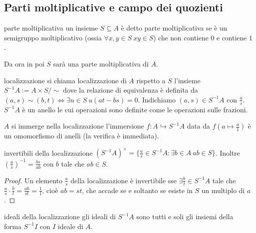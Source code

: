 \subsection{Parti moltiplicative e campo dei quozienti}
\begin{definition}{parte moltiplicativa}
    un insieme $S \subseteq A$ è detto parte moltiplicativa se è un semigruppo moltiplicativo (ossia $\forall x,y\in S \ xy \in S$) che non contiene $0$ e contiene $1$.
    
    Da ora in poi $S$ sarà una parte moltiplicativa di $A$.
\end{definition}
\begin{definition}{localizzazione}
    si chiama localizzazione di $A$ rispetto a $S$ l'insieme $S^{-1}A := A \times S / \sim$ dove la relazione di equivalenza è definita da $(a, s) \sim (b, t) \iff \exists u \in S \ u(at - bs) = 0$. Indichiamo $(a, s) \in S^{-1}A$ con $\frac{a}{s}$. $S^{-1}A$ è un anello le cui operazioni sono definite come le operazioni sulle frazioni.
\end{definition}
\begin{proposition}{$A$ si immerge nella localizzazione}
    l'immersione $f: A \hookrightarrow S^{-1}A$ data da $f(a \mapsto \frac{a}{1})$ è un omomorfismo di anelli (la verifica è immediata).
\end{proposition}
\begin{proposition}{invertibili della localizzazione}
    $(S^{-1}A)^\times = \{ \frac{a}{s} \in S^{-1}A : \exists b \in A \ ab \in S \}$. Inoltre $\left(\frac{a}{s}\right)^{-1} = \frac{bs}{ab}$ con $b$ tale che $ab \in S$.
\end{proposition}
\begin{proof}
    Un elemento $\frac{a}{s}$ della localizzazione è invertibile sse $\exists \frac{b}{t} \in S^{-1}A$ tale che $\frac{a}{s} \cdot \frac{b}{t} = \frac{ab}{st} = \frac{1}{1}$, cioè $ab = st$, che accade se e soltanto se esiste in $S$ un multiplo di $a$.
\end{proof}
\begin{theorem}{ideali della localizzazione}
    gli ideali di $S^{-1}A$ sono tutti e soli gli insiemi della forma $S^{-1}I$ con $I$ ideale di $A$.
\end{theorem}
